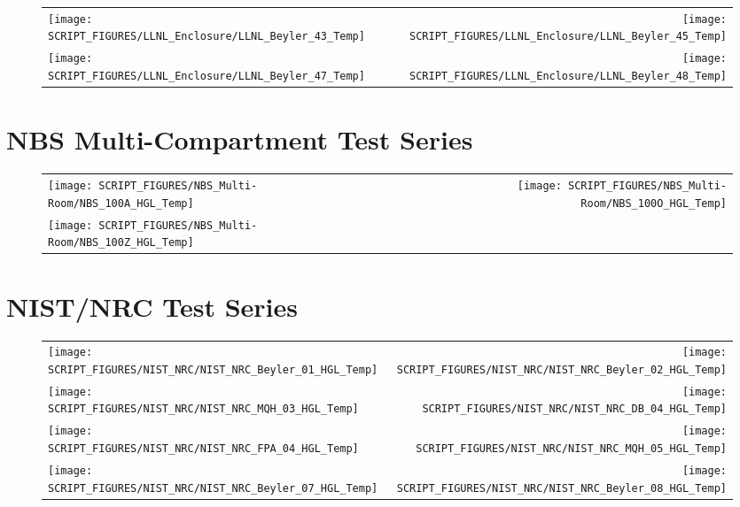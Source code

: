 \begin{figure}[!ht]
\begin{tabular*}{\textwidth}{l@{\extracolsep{\fill}}r}
\texttt{[image: SCRIPT\_FIGURES/LLNL\_Enclosure/LLNL\_Beyler\_43\_Temp]} &
\texttt{[image: SCRIPT\_FIGURES/LLNL\_Enclosure/LLNL\_Beyler\_45\_Temp]} \\
\texttt{[image: SCRIPT\_FIGURES/LLNL\_Enclosure/LLNL\_Beyler\_47\_Temp]} &
\texttt{[image: SCRIPT\_FIGURES/LLNL\_Enclosure/LLNL\_Beyler\_48\_Temp]}
\end{tabular*}
\end{figure}

\clearpage

\section{NBS Multi-Compartment Test Series}

\begin{figure}[!ht]
\begin{tabular*}{\textwidth}{l@{\extracolsep{\fill}}r}
\texttt{[image: SCRIPT\_FIGURES/NBS\_Multi-Room/NBS\_100A\_HGL\_Temp]} &
\texttt{[image: SCRIPT\_FIGURES/NBS\_Multi-Room/NBS\_100O\_HGL\_Temp]} \\
\texttt{[image: SCRIPT\_FIGURES/NBS\_Multi-Room/NBS\_100Z\_HGL\_Temp]}
\end{tabular*}
\end{figure}

\clearpage

\section{NIST/NRC Test Series}

\begin{figure}[!ht]
\begin{tabular*}{\textwidth}{l@{\extracolsep{\fill}}r}
\texttt{[image: SCRIPT\_FIGURES/NIST\_NRC/NIST\_NRC\_Beyler\_01\_HGL\_Temp]} &
\texttt{[image: SCRIPT\_FIGURES/NIST\_NRC/NIST\_NRC\_Beyler\_02\_HGL\_Temp]} \\
\texttt{[image: SCRIPT\_FIGURES/NIST\_NRC/NIST\_NRC\_MQH\_03\_HGL\_Temp]} &
\texttt{[image: SCRIPT\_FIGURES/NIST\_NRC/NIST\_NRC\_DB\_04\_HGL\_Temp]} \\
\texttt{[image: SCRIPT\_FIGURES/NIST\_NRC/NIST\_NRC\_FPA\_04\_HGL\_Temp]} &
\texttt{[image: SCRIPT\_FIGURES/NIST\_NRC/NIST\_NRC\_MQH\_05\_HGL\_Temp]} \\
\texttt{[image: SCRIPT\_FIGURES/NIST\_NRC/NIST\_NRC\_Beyler\_07\_HGL\_Temp]} &
\texttt{[image: SCRIPT\_FIGURES/NIST\_NRC/NIST\_NRC\_Beyler\_08\_HGL\_Temp]}
\end{tabular*}
\end{figure}

